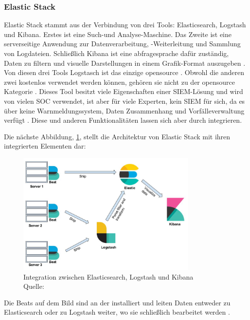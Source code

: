 \subsubsection{Elastic Stack}
Elastic Stack stammt aus der Verbindung von drei Tools: Elasticsearch, Logstash und Kibana. Erstes ist eine Such-und Analyse-Maschine. Das Zweite ist eine serverseitige Anwendung zur Datenverarbeitung, -Weiterleitung und Sammlung von Logdateien. Schließlich Kibana \label{kibana} ist eine \gls{abfragesprache} dafür zuständig, Daten zu filtern und visuelle Darstellungen in einem Grafik-Format auszugeben \citep{packt_elkstack}. Von diesen drei Tools Logstasch ist das einzige \gls{opensource} \citep{elastic_OSI}. Obwohl die anderen zwei 
kostenlos verwendet werden können, gehören sie nicht zu der \gls{opensource} Kategorie \citep{OpenSource_Def}. Dieses Tool besitzt viele Eigenschaften einer \gls{SIEM}-Lösung und wird von vielen SOC verwendet, ist aber für viele Experten, kein \gls{SIEM} für sich, da es über keine Warnmeldungssystem, Daten Zusammenhang und Vorfälleverwaltung verfügt \citep{Miller_ELK}. Diese und anderen Funktionalitäten lassen sich aber durch  integrieren. 

\newpage
Die nächste Abbildung, \ref{fig:Intregation_ELK}, stellt die Architektur von Elastic Stack mit ihren integrierten Elementen dar:

\begin{figure}[H]
   \centering
   \includegraphics[width=0.8\textwidth]{assets/2_p8.png}
   \caption[Integration zwischen Elasticsearch, Logstash und Kibana]
   {Integration zwischen Elasticsearch, Logstash und Kibana\\Quelle: \citep{packt_elkstack} }
   \label{fig:Intregation_ELK}
   \centering
\end{figure}

Die Beats auf dem Bild sind an der  installiert und leiten Daten entweder zu Elasticsearch oder zu Logstash weiter, wo sie schließlich bearbeitet werden \citep{Jain_LMELK}. 

